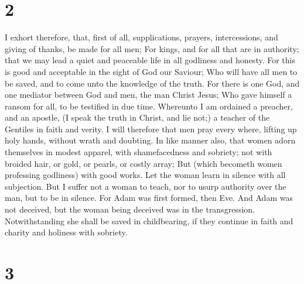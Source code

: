 \hypertarget{section-1}{%
\section{2}\label{section-1}}

 I exhort therefore, that, first of all, supplications,
prayers, intercessions, and giving of thanks, be made for all men;
 For kings, and for all that are in authority; that we may
lead a quiet and peaceable life in all godliness and honesty.
 For this is good and acceptable in the sight of God our
Saviour;  Who will have all men to be saved, and to come
unto the knowledge of the truth.  For there is one God,
and one mediator between God and men, the man Christ Jesus;
 Who gave himself a ransom for all, to be testified in due
time.  Whereunto I am ordained a preacher, and an apostle,
(I speak the truth in Christ, and lie not;) a teacher of the Gentiles in
faith and verity.  I will therefore that men pray every
where, lifting up holy hands, without wrath and doubting. 
In like manner also, that women adorn themselves in modest apparel, with
shamefacedness and sobriety; not with broided hair, or gold, or pearls,
or costly array;  But (which becometh women professing
godliness) with good works.  Let the woman learn in
silence with all subjection.  But I suffer not a woman to
teach, nor to usurp authority over the man, but to be in silence.
 For Adam was first formed, then Eve.  And
Adam was not deceived, but the woman being deceived was in the
transgression.  Notwithstanding she shall be saved in
childbearing, if they continue in faith and charity and holiness with
sobriety.

\hypertarget{section-2}{%
\section{3}\label{section-2}}

